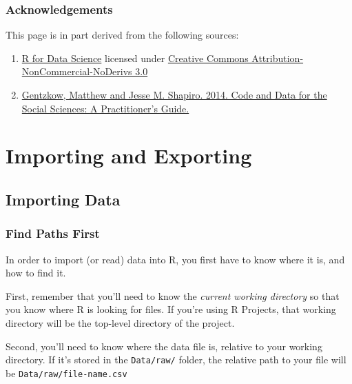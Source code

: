 \documentclass[]{book}
\begin{document}
\hypertarget{acknowledgements-1}{%
\subsubsection*{Acknowledgements}\label{acknowledgements-1}}

This page is in part derived from the following sources:

\begin{enumerate}
\def\labelenumi{\arabic{enumi}.}
\item
  \href{https://r4ds.had.co.nz}{R for Data Science} licensed under \href{https://creativecommons.org/licenses/by-nc-nd/3.0/us/}{Creative Commons Attribution-NonCommercial-NoDerivs 3.0}
\item
  \href{https://web.stanford.edu/~gentzkow/research/CodeAndData.pdf}{Gentzkow, Matthew and Jesse M. Shapiro. 2014. Code and Data for the Social Sciences: A Practitioner's Guide.}
\end{enumerate}

\hypertarget{importing-and-exporting}{%
\section{Importing and Exporting}\label{importing-and-exporting}}

\hypertarget{importing-data}{%
\subsection{Importing Data}\label{importing-data}}

\hypertarget{find-paths-first}{%
\subsubsection*{Find Paths First}\label{find-paths-first}}

In order to import (or read) data into R, you first have to know where it is, and how to find it.

First, remember that you'll need to know the \emph{current working directory} so that you know where R is looking for files. If you're using R Projects, that working directory will be the top-level directory of the project.

Second, you'll need to know where the data file is, relative to your working directory. If it's stored in the \texttt{Data/raw/} folder, the relative path to your file will be \texttt{Data/raw/file-name.csv}
\end{document}
